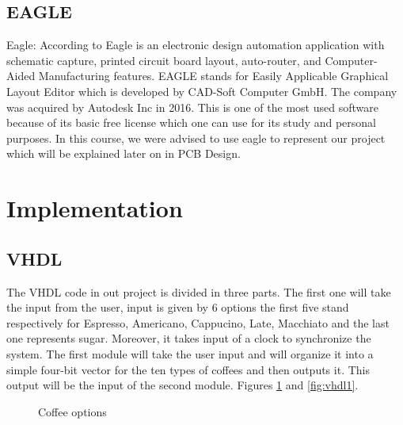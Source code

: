 \documentclass[12pt]{article}
\begin{document}
\subsection{EAGLE}

Eagle: According to \cite{eagle} Eagle is an electronic design automation application with schematic capture, printed circuit board layout, auto-router, and Computer-Aided Manufacturing features. EAGLE stands for Easily Applicable Graphical Layout Editor which is developed by CAD-Soft Computer GmbH. The company was acquired by Autodesk Inc in 2016. This is one of the most used software because of its basic free license which one can use for its study and personal purposes. In this course, we were advised to use eagle to represent our project which will be explained later on in PCB Design.

\section{Implementation}

\subsection{VHDL}

The VHDL code in out project is divided in three parts. The first one will take the input from the user, input is given by 6 options the first five stand respectively for Espresso, Americano, Cappucino, Late, Macchiato and the last one represents sugar. Moreover, it takes input of a clock to synchronize the system. The first module will take the user input and will organize it into a simple four-bit vector for the ten types of coffees and then outputs it. This output will be the input of the second module. Figures \ref{fig:table1} and \ref{fig:vhdl1}.


\begin{figure}[H]
\caption{Coffee options}
\label{fig:table1}
\end{figure}
\end{document}
